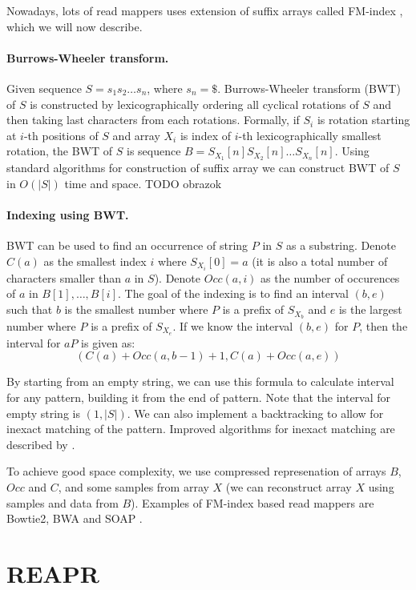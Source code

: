 Nowadays, lots of read mappers uses extension of suffix arrays called FM-index
\citep{fmindex, fmindex2}, which we will now describe.

\paragraph{Burrows-Wheeler transform.} Given sequence $S = s_1 s_2 \dots s_n$, where
$s_n = \$$. Burrows-Wheeler transform (BWT) of $S$ is constructed
by lexicographically ordering all cyclical rotations of $S$ and then
taking last characters from each rotations.
Formally, if $S_i$ is rotation starting at $i$-th positions of $S$ and array
$X_i$ is index of $i$-th lexicographically smallest rotation, the
BWT of $S$ is sequence $B = S_{X_1}[n] S_{X_2}[n] \dots S_{X_n}[n]$.
Using standard algorithms for construction of suffix array we
can construct BWT of $S$ in $O(|S|)$ time and space.
TODO obrazok

\paragraph{Indexing using BWT.}
BWT can be used to find an occurrence of string $P$ in $S$ as a substring.
Denote $C(a)$ as the smallest index $i$ where $S_{X_i}[0] = a$ (it is also
a total number of characters smaller than $a$ in $S$).
Denote $Occ(a,i)$ as the number of occurences of $a$ in $B[1], \dots, B[i]$.
The goal of the indexing is to find an interval $(b, e)$ such that
$b$ is the smallest number where $P$ is a prefix of $S_{X_b}$
and $e$ is the largest number where $P$ is a prefix of $S_{X_e}$.
If we know the interval $(b, e)$ for $P$, then the interval for
$aP$ is given as:
$$(C(a) + Occ(a, b - 1) + 1, C(a) + Occ(a, e))$$

By starting from an empty string, we can use
this formula to calculate interval for any pattern, building
it from the end of pattern. Note that
the interval for empty string is $(1, |S|)$.
We can also implement
a backtracking to allow for inexact matching of the pattern. 
Improved algorithms for inexact matching are described by \citet{fmindex3}.

To achieve good space complexity, we use compressed represenation
of arrays $B$, $Occ$ and $C$, and some samples from array $X$ (we can reconstruct
array $X$ using samples and data from $B$). 
Examples of FM-index based read mappers are Bowtie2, BWA and SOAP
\citep{bowtie2,fmindex,soap}.

\section{REAPR}

